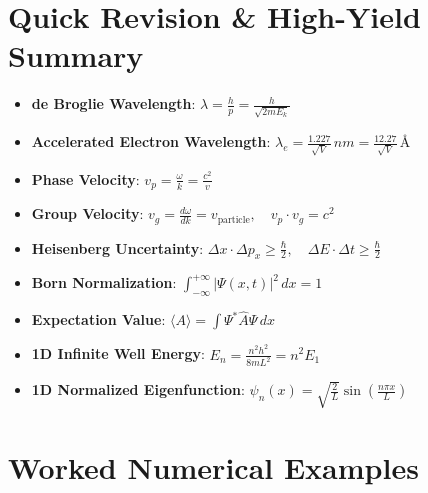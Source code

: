 \section{Quick Revision \& High-Yield Summary}

\begin{quickrevision}
\begin{itemize}
    \item \textbf{de Broglie Wavelength}: $\lambda = \frac{h}{p} = \frac{h}{\sqrt{2m E_k}}$
    \item \textbf{Accelerated Electron Wavelength}: $\lambda_e = \frac{1.227}{\sqrt{V}}\,\si{nm} = \frac{12.27}{\sqrt{V}}\,\si{\text{\AA}}$
    \item \textbf{Phase Velocity}: $v_p = \frac{\omega}{k} = \frac{c^2}{v}$
    \item \textbf{Group Velocity}: $v_g = \frac{d\omega}{dk} = v_{\text{particle}}, \quad v_p \cdot v_g = c^2$
    \item \textbf{Heisenberg Uncertainty}: $\Delta x \cdot \Delta p_x \ge \frac{\hbar}{2}, \quad \Delta E \cdot \Delta t \ge \frac{\hbar}{2}$
    \item \textbf{Born Normalization}: $\int_{-\infty}^{+\infty} |\Psi(x,t)|^2\,dx = 1$
    \item \textbf{Expectation Value}: $\langle A \rangle = \int \Psi^* \hat{A} \Psi\,dx$
    \item \textbf{1D Infinite Well Energy}: $E_n = \frac{n^2 h^2}{8mL^2} = n^2 E_1$
    \item \textbf{1D Normalized Eigenfunction}: $\psi_n(x) = \sqrt{\frac{2}{L}}\sin\left(\frac{n\pi x}{L}\right)$
\end{itemize}
\end{quickrevision}

\section{Worked Numerical Examples}

